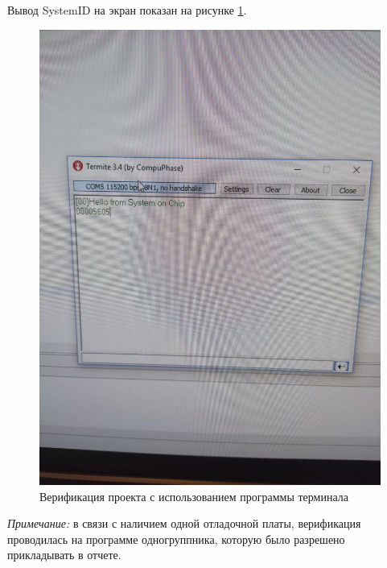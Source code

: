 Вывод SystemID на экран показан на рисунке \ref{img:result}.

\begin{figure}[H]
	\begin{center}
		\includegraphics[scale=0.3]{img/result.jpg}
	\end{center}
	\captionsetup{justification=centering}
	\caption{Верификация проекта с использованием программы терминала}
	\label{img:result}
\end{figure}

\textit{Примечание:} в связи с наличием одной отладочной платы, верификация проводилась на программе одногруппника, которую было разрешено прикладывать в отчете.

  


